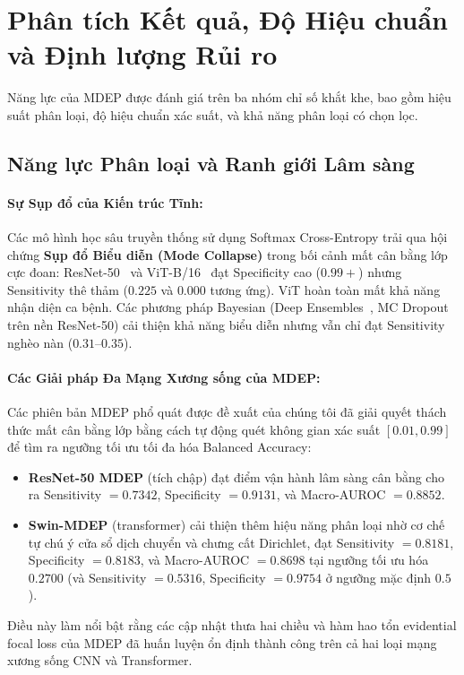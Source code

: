 \documentclass[11pt, a4paper]{article}
\begin{document}
\section{Phân tích Kết quả, Độ Hiệu chuẩn và Định lượng Rủi ro}\label{sec:results}

Năng lực của MDEP được đánh giá trên ba nhóm chỉ số khắt khe, bao gồm hiệu suất phân loại, độ hiệu chuẩn xác suất, và khả năng phân loại có chọn lọc.

\subsection{Năng lực Phân loại và Ranh giới Lâm sàng}\label{subsec:classification}

\paragraph{Sự Sụp đổ của Kiến trúc Tĩnh:}
Các mô hình học sâu truyền thống sử dụng Softmax Cross-Entropy trải qua hội chứng \textbf{Sụp đổ Biểu diễn (Mode Collapse)} trong bối cảnh mất cân bằng lớp cực đoan: ResNet-50~\cite{he2016deep} và ViT-B/16~\cite{dosovitskiy2021image} đạt Specificity cao ($0.99{+}$) nhưng Sensitivity thê thảm ($0.225$ và $0.000$ tương ứng). ViT hoàn toàn mất khả năng nhận diện ca bệnh. Các phương pháp Bayesian (Deep Ensembles~\cite{lakshminarayanan2017simple}, MC Dropout~\cite{gal2016dropout} trên nền ResNet-50) cải thiện khả năng biểu diễn nhưng vẫn chỉ đạt Sensitivity nghèo nàn ($0.31$--$0.35$).

\paragraph{Các Giải pháp Đa Mạng Xương sống của MDEP:}
Các phiên bản MDEP phổ quát được đề xuất của chúng tôi đã giải quyết thách thức mất cân bằng lớp bằng cách tự động quét không gian xác suất $[0.01, 0.99]$ để tìm ra ngưỡng tối ưu tối đa hóa Balanced Accuracy:
\begin{itemize}
    \item \textbf{ResNet-50 MDEP} (tích chập) đạt điểm vận hành lâm sàng cân bằng cho ra Sensitivity $= 0.7342$, Specificity $= 0.9131$, và Macro-AUROC $= 0.8852$.
    \item \textbf{Swin-MDEP} (transformer) cải thiện thêm hiệu năng phân loại nhờ cơ chế tự chú ý cửa sổ dịch chuyển và chưng cất Dirichlet, đạt Sensitivity $= 0.8181$, Specificity $= 0.8183$, và Macro-AUROC $= 0.8698$ tại ngưỡng tối ưu hóa $0.2700$ (và Sensitivity $= 0.5316$, Specificity $= 0.9754$ ở ngưỡng mặc định $0.5$).
\end{itemize}
Điều này làm nổi bật rằng các cập nhật thưa hai chiều và hàm hao tổn evidential focal loss của MDEP đã huấn luyện ổn định thành công trên cả hai loại mạng xương sống CNN và Transformer.
\end{document}
